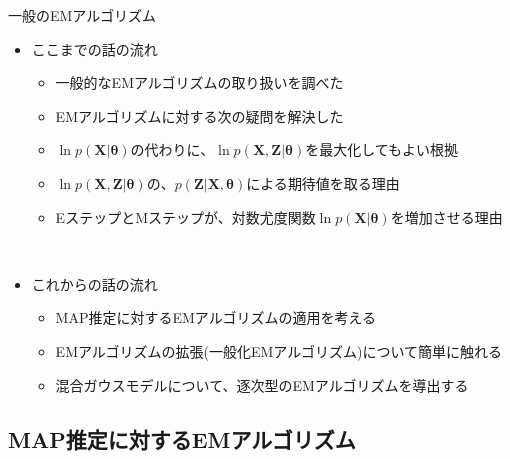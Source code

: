 \documentclass[dvipdfmx,notheorems,t]{beamer}
\begin{document}
\begin{frame}{一般のEMアルゴリズム}

\begin{itemize}
	\item ここまでの話の流れ
	\begin{itemize}
		\item 一般的なEMアルゴリズムの取り扱いを調べた
		\item EMアルゴリズムに対する次の疑問を解決した
		\newline
		\item $\ln p(\bm{X} | \bm{\theta})$の代わりに、\color{red}$\ln p(\bm{X}, \bm{Z} | \bm{\theta})$を最大化してもよい根拠\normalcolor
		\item $\ln p(\bm{X}, \bm{Z} | \bm{\theta})$の、$p(\bm{Z} | \bm{X}, \bm{\theta})$による\alert{期待値を取る理由}
		\item EステップとMステップが、\color{red}対数尤度関数$\ln p(\bm{X} | \bm{\theta})$を増加させる\normalcolor 理由
	\end{itemize} \
	
	\item これからの話の流れ
	\begin{itemize}
		\item \alert{MAP推定}に対するEMアルゴリズムの適用を考える
		\item EMアルゴリズムの拡張(\alert{一般化EMアルゴリズム})について簡単に触れる
		\item 混合ガウスモデルについて、\alert{逐次型}のEMアルゴリズムを導出する
	\end{itemize}
\end{itemize}

\end{frame}

\subsection{MAP推定に対するEMアルゴリズム}
\end{document}
